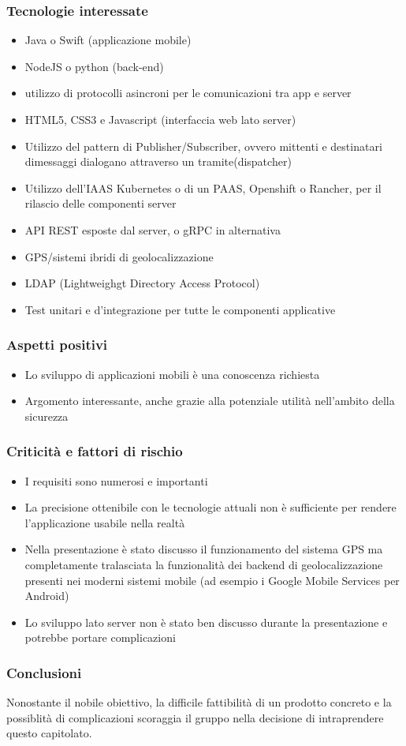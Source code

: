 \subsubsection{Tecnologie interessate}
\begin{itemize}
	\item Java o Swift (applicazione mobile)
	\item NodeJS o python (back-end)
	\item utilizzo di protocolli asincroni per le comunicazioni tra app e server
	\item HTML5, CSS3 e Javascript (interfaccia web lato server)
	\item Utilizzo del pattern di Publisher/Subscriber, ovvero mittenti e destinatari dimessaggi dialogano attraverso un tramite(dispatcher)
	\item Utilizzo dell’IAAS Kubernetes o di un PAAS, Openshift o Rancher, per il rilascio delle componenti server
	\item API REST esposte dal server, o gRPC in alternativa
	\item GPS/sistemi ibridi di geolocalizzazione
	\item LDAP (Lightweighgt Directory Access Protocol)
	\item Test unitari e d'integrazione per tutte le componenti applicative
\end{itemize}
\subsubsection{Aspetti positivi}
\begin{itemize}
	\item Lo sviluppo di applicazioni mobili è una conoscenza richiesta
	\item Argomento interessante, anche grazie alla potenziale utilità nell'ambito della sicurezza
\end{itemize}
\subsubsection{Criticità e fattori di rischio}
\begin{itemize}
	\item I requisiti sono numerosi e importanti
	\item La precisione ottenibile con le tecnologie attuali non è sufficiente per rendere l’applicazione usabile nella realtà
	\item Nella presentazione è stato discusso il funzionamento del sistema GPS ma completamente tralasciata la funzionalità dei backend di geolocalizzazione presenti nei moderni sistemi mobile (ad esempio i Google Mobile Services per Android)
	\item Lo sviluppo lato server non è stato ben discusso durante la presentazione e potrebbe portare complicazioni
\end{itemize}
\subsubsection{Conclusioni}
Nonostante il nobile obiettivo, la difficile fattibilità di un prodotto concreto e la possiblità di complicazioni scoraggia il gruppo nella decisione di intraprendere questo capitolato.
